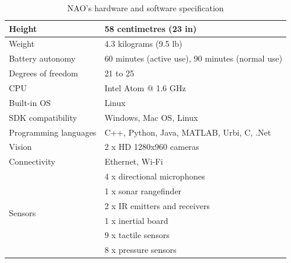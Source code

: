 \begin{table}
	[h] \centering \caption{NAO's hardware and software specification } \label{tb:nao} 
	\begin{tabular}
		{|l|l|} \hline Height & 58 centimetres (23 in) \\
		\hline Weight & 4.3 kilograms (9.5 lb) \\
		\hline Battery autonomy & 60 minutes (active use), 90 minutes (normal use) \\
		\hline Degrees of freedom & 21 to 25 \\
		\hline CPU & Intel Atom @ 1.6 GHz \\
		\hline Built-in OS & Linux \\
		\hline SDK compatibility & Windows, Mac OS, Linux \\
		\hline Programming languages & C++, Python, Java, MATLAB, Urbi, C, .Net \\
		\hline Vision & 2 x HD 1280x960 cameras \\
		\hline Connectivity & Ethernet, Wi-Fi \\
		\hline \multirow{6}{*}{Sensors} & 4 x directional microphones \\
		& 1 x sonar rangefinder \\
		& 2 x IR emitters and receivers \\
		& 1 x inertial board \\
		& 9 x tactile sensors \\
		& 8 x pressure sensors \\
		\hline 
	\end{tabular}
\end{table}

